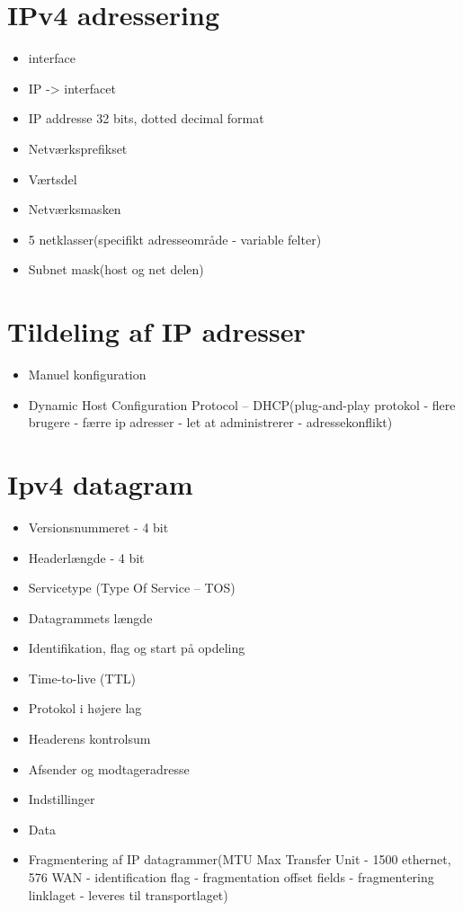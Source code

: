 \section{IPv4 adressering}
\begin{itemize}
	\item interface
	\item IP -> interfacet
	\item IP addresse 32 bits, dotted decimal format
	\item Netværksprefikset
	\item Værtsdel
	\item Netværksmasken
	\item 5 netklasser(specifikt adresseområde - variable felter)
	\item Subnet mask(host og net delen)
\end{itemize}

\section{Tildeling af IP adresser}
\begin{itemize}
	\item Manuel konfiguration
	\item Dynamic Host Configuration Protocol – DHCP(plug-and-play protokol - flere brugere - færre ip adresser - let at administrerer - adressekonflikt)
\end{itemize}

\section{Ipv4 datagram}
\begin{itemize}
	\item Versionsnummeret - 4 bit
	\item Headerlængde - 4 bit
	\item Servicetype (Type Of Service – TOS)
	\item Datagrammets længde
	\item Identifikation, flag og start på opdeling
	\item Time-to-live (TTL)
	\item Protokol i højere lag
	\item Headerens kontrolsum
	\item Afsender og modtageradresse
	\item Indstillinger
	\item Data
	\item Fragmentering af IP datagrammer(MTU Max Transfer Unit - 1500 ethernet, 576 WAN - identification flag - fragmentation offset fields - fragmentering  linklaget - leveres til transportlaget) 
\end{itemize}

